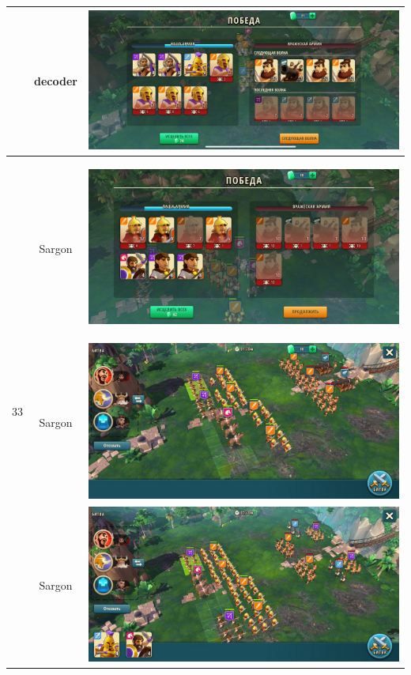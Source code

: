 \begin{longtable}{|c|c|c|}
	& decoder &
	\includegraphics[width=0.75\linewidth]{./parts/media/TreasureHunt/32/decoder/photo_2022-04-07_10-01-48.jpg} \\
	\hline
	\multirow{12}{*}{33} & Sargon &
	\hypertarget{fight33}{\includegraphics[width=0.75\linewidth]{./parts/media/TreasureHunt/33/sargon/photo_2022-04-07_10-06-40.jpg}} \\
	& Sargon &
	\includegraphics[width=0.75\linewidth]{./parts/media/TreasureHunt/33/sargon/photo_2022-04-07_10-06-37.jpg} \\
	& Sargon &
	\includegraphics[width=0.75\linewidth]{./parts/media/TreasureHunt/33/sargon/photo_2022-04-07_10-06-22.jpg} \\

\end{longtable}
